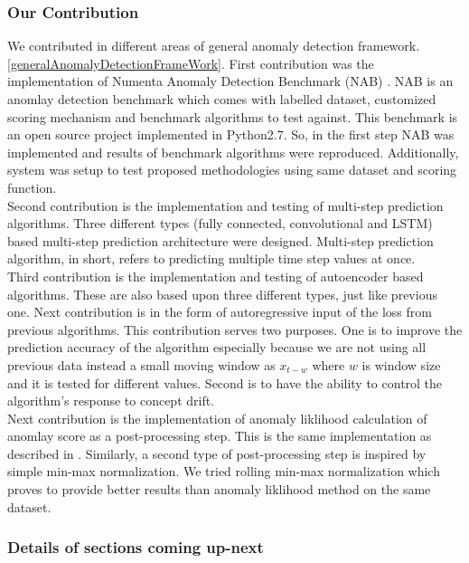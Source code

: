 \documentclass[12pt]{article}
\begin{document}
\subsubsection{Our Contribution}
We contributed in different areas of general anomaly detection framework.\ref{generalAnomalyDetectionFrameWork}. First contribution was the implementation of Numenta Anomaly Detection Benchmark (NAB) \cite{NAB}. NAB is an anomlay detection benchmark which comes with labelled dataset, customized scoring mechanism and benchmark algorithms to test against. This benchmark is an open source project implemented in Python2.7. So, in the first step NAB was implemented and results of benchmark algorithms were reproduced. Additionally, system was setup to test proposed methodologies using same dataset and scoring function.\\
\break
Second contribution is the implementation and testing of multi-step prediction algorithms. Three different types (fully connected, convolutional and LSTM) based multi-step prediction architecture were designed. Multi-step prediction algorithm, in short, refers to predicting multiple time step values at once. \\
\break 
Third contribution is the implementation and testing of autoencoder based algorithms. These are also based upon three different types, just like previous one. Next contribution is in the form of autoregressive input of the loss from previous algorithms. This contribution serves two purposes. One is to improve the prediction accuracy of the algorithm especially because we are not using all previous data instead a small moving window as $x_{t-w}$ where $w$ is window size and it is tested for different values. Second is to have the ability to control the algorithm's response to concept drift.
\\
\break
Next contribution is the implementation of anomaly liklihood calculation of anomlay score as a post-processing step. This is the same implementation as described in \cite{ahmad2017unsupervised}. Similarly, a second type of post-processing step is inspired by simple min-max normalization. We tried rolling min-max normalization which proves to provide better results than anomaly liklihood method on the same dataset.


\subsubsection{Details of sections coming up-next}
\newpage
\end{document}
